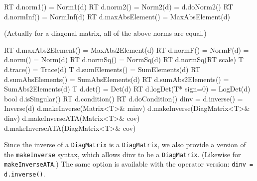 \documentclass[twoside,letterpaper,11pt]{article}
\renewcommand{\tt}[1]{{\lstinline {#1}}}
\begin{document}
\begin{tmvcode}
RT d.norm1() = Norm1(d)
RT d.norm2() = Norm2(d) = d.doNorm2()
RT d.normInf() = NormInf(d)
RT d.maxAbsElement() = MaxAbsElement(d)
\end{tmvcode}
(Actually for a diagonal matrix, all of the above norms are equal.)
\begin{tmvcode}
RT d.maxAbs2Element() = MaxAbs2Element(d)
RT d.normF() = NormF(d) = d.norm() = Norm(d)
RT d.normSq() = NormSq(d)
RT d.normSq(RT scale)
T d.trace() = Trace(d)
T d.sumElements() = SumElements(d)
RT d.sumAbsElements() = SumAbsElements(d)
RT d.sumAbs2Elements() = SumAbs2Elements(d)
T d.det() = Det(d)
RT d.logDet(T* sign=0) = LogDet(d)
bool d.isSingular()
RT d.condition()
RT d.doCondition()
dinv = d.inverse() = Inverse(d)
d.makeInverse(Matrix<T>& minv)
d.makeInverse(DiagMatrix<T>& dinv)
d.makeInverseATA(Matrix<T>& cov)
d.makeInverseATA(DiagMatrix<T>& cov)
\end{tmvcode}
Since the inverse of a \tt{DiagMatrix} is a \tt{DiagMatrix},
we also provide a version of the \tt{makeInverse} syntax, which allows dinv
to be a \tt{DiagMatrix}.  (Likewise for \tt{makeInverseATA}.)  The same option is 
available with the operator version: \tt{dinv = d.inverse()}.
\end{document}
